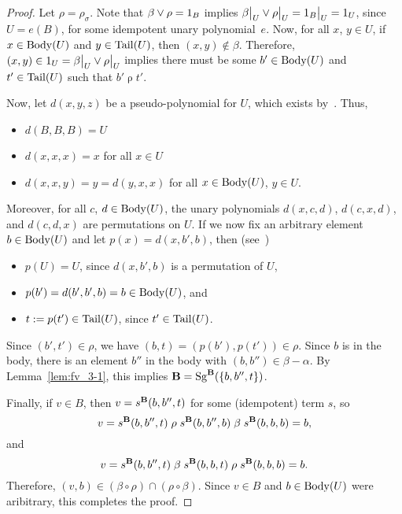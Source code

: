 \newcommand\rhosig{\ensuremath{\rho}}
\begin{proof}
\noindent Let $\rho = \rho_\sigma$. Note that
$\beta \join \rhosig = 1_B$ implies
$\restr{\beta}{U} \join \restr{\rhosig}{U} = \restr{1_B}{U} = 1_U$,
since $U = e(B)$, for some idempotent unary polynomial~$e$.
Now, for all $x$, $y \in U$, if $x\in \operatorname{Body}(U)$ and $y\in \operatorname{Tail}(U)$, then
$(x,y) \notin \beta$.  Therefore,
$(x, y) \in  1_U = \restr{\beta}{U} \join \restr{\rhosig}{U}$ implies
there must be some $b' \in \operatorname{Body}(U)$ and $t'\in \operatorname{Tail}(U)$ such that
$b' \mathrel{\rhosig} t'$.

Now, let $d(x,y,z)$ be a pseudo-\malcev polynomial for $U$,
which exists by~\cite[Lemma~4.20]{HM:1988}.
Thus,
\begin{itemize}
\item $d(B,B,B) = U$
\item $d(x,x,x) = x$ for all $x\in U$
\item $d(x,x,y) = y = d(y,x,x)$ for all $x\in \operatorname{Body}(U)$, $y \in U$.
\end{itemize}
Moreover, for all $c$, $d \in \operatorname{Body}(U)$, the unary polynomials
$d(x,c,d)$, $d(c,x,d)$, and $d(c,d,x)$ are permutations on $U$.
If we now fix an arbitrary element $b\in \operatorname{Body}(U)$ and
let $p(x) = d(x,b',b)$, then (see~\cite[Lemma~4.20]{HM:1988})
\begin{itemize}
\item  $p(U) = U$, since $d(x, b', b)$ is a permutation of $U$, %
\item $p(b') = d(b',b',b) = b \in \operatorname{Body}(U)$, and
\item  $t:=p(t')\in \operatorname{Tail}(U)$, since $t'\in \operatorname{Tail}(U)$.
\end{itemize}
Since $(b',t') \in \rhosig$, we have $(b, t) = (p(b'), p(t')) \in \rhosig$.
Since $b$ is in the body, there is an element $b''$ in the body with
$(b,b'') \in \beta - \alpha$. By Lemma~\ref{lem:fv_3-1}, this implies
$\mathbf{B} = \operatorname{Sg}^{\mathbf{B}}(\{b, b'', t\})$.

Finally, if $v \in B$, then $v = s^{\mathbf{B}}(b,b'',t)$ for
some (idempotent) term $s$, so
\[
v = s^{\alg{B}}(b,b'',t)
\mathrel{\rhosig} s^{\alg{B}}(b,b'',b)
\mathrel{\beta} s^{\alg{B}}(b,b,b) = b,
\]
and
\[
v = s^{\alg{B}}(b,b'',t)
\mathrel{\beta}  s^{\alg{B}}(b,b,t)
\mathrel{\rhosig}s^{\alg{B}}(b,b, b)  = b.
\]
Therefore,
$(v,b) \in  (\beta \circ \rhosig) \cap (\rhosig \circ \beta)$.
Since $v \in B$ and $b\in \operatorname{Body}(U)$ were aribitrary,
this completes the proof.
\end{proof}



